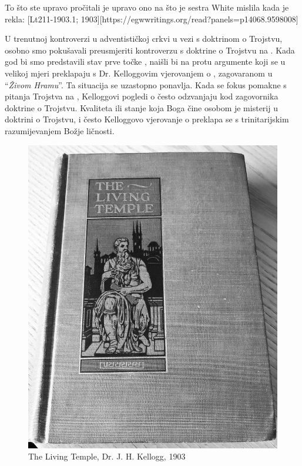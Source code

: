To što ste upravo pročitali je upravo ono na što je sestra White mislila kada je rekla: [Lt211-1903.1; 1903][https://egwwritings.org/read?panels=p14068.9598008]

U trenutnoj kontroverzi u adventističkoj crkvi u vezi s doktrinom o Trojstvu, osobno smo pokušavali preusmjeriti kontroverzu s doktrine o Trojstvu na . Kada god bi smo predstavili stav prve točke , naišli bi na protu argumente koji se u velikoj mjeri preklapaju s Dr. Kelloggovim vjerovanjem o , zagovaranom u “\textit{Živom Hramu}”. Ta situacija se uzastopno ponavlja. Kada se fokus pomakne s pitanja Trojstva na , Kelloggovi pogledi o  često odzvanjaju kod zagovornika doktrine o Trojstvu. Kvaliteta ili stanje koja Boga čine osobom je misterij u doktrini o Trojstvu, i često Kelloggovo vjerovanje o  preklapa se s trinitarijskim razumijevanjem Božje ličnosti.

\begin{figure}[hp]
    \centering
    \includegraphics[width=1\linewidth]{images/TLT.jpg}
    \caption*{The Living Temple, Dr. J. H. Kellogg, 1903}
    \label{fig:tlt}
\end{figure}

